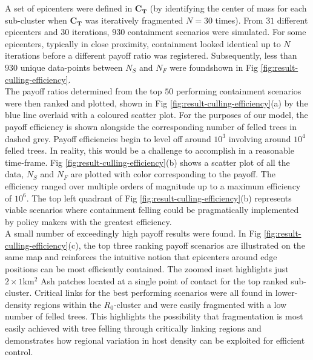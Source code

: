 A set of epicenters were defined in $\mathbf{C_T}$ (by identifying the center of mass for each sub-cluster when $\mathbf{C_T}$ was iteratively fragmented $N=30$ times). From $31$ different epicenters and $30$ iterations, $930$ containment scenarios were simulated. For some epicenters, typically in close proximity, containment looked identical up to $N$ iterations before a different payoff ratio was registered. Subsequently, less than $930$ unique data-points between $N_S$ and $N_F$ were found\textemdash shown in Fig \ref{fig:result-culling-efficiency}.\\

The payoff ratios determined from the top $50$ performing containment scenarios were then ranked and plotted, shown in Fig \ref{fig:result-culling-efficiency}(a) by the blue line overlaid with a coloured scatter plot. For the purposes of our model, the payoff efficiency is shown alongside the corresponding number of felled trees in dashed grey. Payoff efficiencies begin to level off around $\mathrm{10^3}$ involving around $\mathrm{10^4}$ felled trees. In reality, this would be a challenge to accomplish in a reasonable time-frame. Fig \ref{fig:result-culling-efficiency}(b) shows a scatter plot of all the data, $N_S$ and $N_F$ are plotted with color corresponding to the payoff. The efficiency ranged over multiple orders of magnitude up to a maximum efficiency of $\mathrm{10^6}$. The top left quadrant of Fig \ref{fig:result-culling-efficiency}(b) represents viable scenarios where containment felling could be pragmatically implemented by policy makers with the greatest efficiency.\\

A small number of exceedingly high payoff results were found. In Fig \ref{fig:result-culling-efficiency}(c), the top three ranking payoff scenarios are illustrated on the same map and reinforces the intuitive notion that epicenters around edge positions can be most efficiently contained. The zoomed inset highlights just $\mathrm{2\times 1km^2}$ Ash patches located at a single point of contact for the top ranked sub-cluster. Critical links for the best performing scenarios were all found in lower-density regions within the $R_0$-cluster and were easily fragmented with a low number of felled trees. This highlights the possibility that fragmentation is most easily achieved with tree felling through critically linking regions and demonstrates how regional variation in host density can be exploited for efficient control.  

